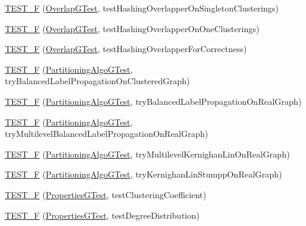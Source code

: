 \begin{DoxyCompactItemize}
\hyperlink{namespace_networ_kit_a1eda995441aa07c4b81db34b4f534bfe}{T\-E\-S\-T\-\_\-\-F} (\hyperlink{class_networ_kit_1_1_overlap_g_test}{Overlap\-G\-Test}, test\-Hashing\-Overlapper\-On\-Singleton\-Clusterings)
\item 
\hyperlink{namespace_networ_kit_a3182533b4b9203b4d1acdddbe1b7f02c}{T\-E\-S\-T\-\_\-\-F} (\hyperlink{class_networ_kit_1_1_overlap_g_test}{Overlap\-G\-Test}, test\-Hashing\-Overlapper\-On\-One\-Clusterings)
\item 
\hyperlink{namespace_networ_kit_a5a6e343c4b01cf76ac557079c1ff2fb0}{T\-E\-S\-T\-\_\-\-F} (\hyperlink{class_networ_kit_1_1_overlap_g_test}{Overlap\-G\-Test}, test\-Hashing\-Overlapper\-For\-Correctness)
\item 
\hyperlink{namespace_networ_kit_a56475ee38bedeba20cd8d99a776989ae}{T\-E\-S\-T\-\_\-\-F} (\hyperlink{class_networ_kit_1_1_partitioning_algo_g_test}{Partitioning\-Algo\-G\-Test}, try\-Balanced\-Label\-Propagation\-On\-Clustered\-Graph)
\item 
\hyperlink{namespace_networ_kit_abde90d433e578d38bef36f3899709b8f}{T\-E\-S\-T\-\_\-\-F} (\hyperlink{class_networ_kit_1_1_partitioning_algo_g_test}{Partitioning\-Algo\-G\-Test}, try\-Balanced\-Label\-Propagation\-On\-Real\-Graph)
\item 
\hyperlink{namespace_networ_kit_a194aa85afa5fd3a838611d62333f47cf}{T\-E\-S\-T\-\_\-\-F} (\hyperlink{class_networ_kit_1_1_partitioning_algo_g_test}{Partitioning\-Algo\-G\-Test}, try\-Multilevel\-Balanced\-Label\-Propagation\-On\-Real\-Graph)
\item 
\hyperlink{namespace_networ_kit_acd2eed72daf10331df78fa249dfb260f}{T\-E\-S\-T\-\_\-\-F} (\hyperlink{class_networ_kit_1_1_partitioning_algo_g_test}{Partitioning\-Algo\-G\-Test}, try\-Multilevel\-Kernighan\-Lin\-On\-Real\-Graph)
\item 
\hyperlink{namespace_networ_kit_a41b7b256debcee5b350fd89a702e91d9}{T\-E\-S\-T\-\_\-\-F} (\hyperlink{class_networ_kit_1_1_partitioning_algo_g_test}{Partitioning\-Algo\-G\-Test}, try\-Kernighan\-Lin\-Stumpp\-On\-Real\-Graph)
\item 
\hyperlink{namespace_networ_kit_aaf886571f3821e9887cb17a6bb088fdb}{T\-E\-S\-T\-\_\-\-F} (\hyperlink{class_networ_kit_1_1_properties_g_test}{Properties\-G\-Test}, test\-Clustering\-Coefficient)
\item 
\hyperlink{namespace_networ_kit_aa8cf52d569c87d1b98ddc214c8b6b9e7}{T\-E\-S\-T\-\_\-\-F} (\hyperlink{class_networ_kit_1_1_properties_g_test}{Properties\-G\-Test}, test\-Degree\-Distribution)
\item 

\end{DoxyCompactItemize}
